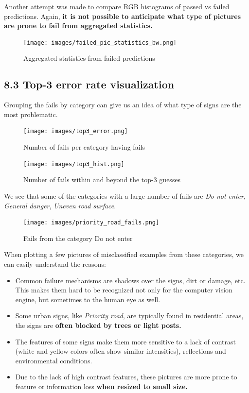 \documentclass[
  11pt,
]{article}
\providecommand{\tightlist}{%
  \setlength{\itemsep}{0pt}\setlength{\parskip}{0pt}}
\begin{document}
Another attempt was made to compare RGB histograms of passed vs failed
predictions. Again, \textbf{it is not possible to anticipate what type
of pictures are prone to fail from aggregated statistics.}

\begin{figure}
\centering
\texttt{[image: images/failed\_pic\_statistics\_bw.png]}
\caption{Aggregated statistics from failed predictions}
\end{figure}

\hypertarget{top-3-error-rate-visualization}{%
\subsection{8.3 Top-3 error rate
visualization}\label{top-3-error-rate-visualization}}

Grouping the fails by category can give us an idea of what type of signs
are the most problematic.

\begin{figure}
\centering
\texttt{[image: images/top3\_error.png]}
\caption{Number of fails per category having fails}
\end{figure}

\begin{figure}
\centering
\texttt{[image: images/top3\_hist.png]}
\caption{Number of fails within and beyond the top-3 guesses}
\end{figure}

We see that some of the categories with a large number of fails are
\emph{Do not enter}, \emph{General danger}, \emph{Uneven road surface}.

\begin{figure}
\centering
\texttt{[image: images/priority\_road\_fails.png]}
\caption{Fails from the category Do not enter}
\end{figure}

When plotting a few pictures of misclassified examples from these
categories, we can easily understand the reasons:

\begin{itemize}
\tightlist
\item
  Common failure mechanisms are shadows over the signs, dirt or damage,
  etc. This makes them hard to be recognized not only for the computer
  vision engine, but sometimes to the human eye as well.
\item
  Some urban signs, like \emph{Priority road}, are typically found in
  residential areas, the signs are \textbf{often blocked by trees or
  light posts.}
\item
  The features of some signs make them more sensitive to a lack of
  contrast (white and yellow colors often show similar intensities),
  reflections and environmental conditions.
\item
  Due to the lack of high contrast features, these pictures are more
  prone to feature or information loss \textbf{when resized to small
  size.}
\end{itemize}
\end{document}
